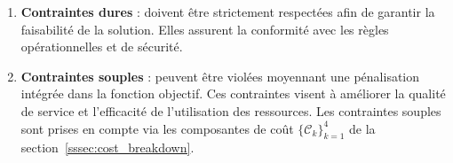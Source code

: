 \begin{tcolorbox}[colback=lightgraybox,colframe=gray,title={\textbf{Contraintes opérationnelles}}]
	\begin{enumerate}[label=\textbf{C\arabic*:}, leftmargin=2em]
		\item \textcolor{prioritycolor}{\textbf{Contraintes dures}} : doivent être strictement respectées afin de garantir la faisabilité de la solution. Elles assurent la conformité avec les règles opérationnelles et de sécurité.
		\item \textcolor{prioritycolor}{\textbf{Contraintes souples}} : peuvent être violées moyennant une pénalisation intégrée dans la fonction objectif. Ces contraintes visent à améliorer la qualité de service et l’efficacité de l’utilisation des ressources.
		Les contraintes souples sont prises en compte via les composantes de coût $\{\mathcal{C}_k\}_{k=1}^4$ de la section~\ref{sssec:cost_breakdown}.
	\end{enumerate}
\end{tcolorbox}

